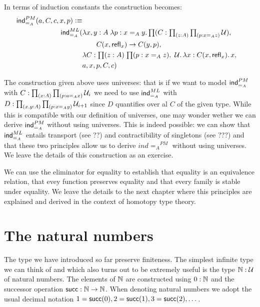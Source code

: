 In terms of induction constants the construction becomes:
\begin{align*}
\ind{=_A}^{PM}(a,C,c,x,p) \defeq \\
\ind{=_A}^{ML}( & \lam{x,y:A}{p:x =_A y} \prd{C : \prd{z:A}{p : x =_A z} \UU} \\
&\qquad C(x,\refl{x}) \to C(y,p),\\
& \lam{C:\prd{z:A}{p : x =_A z} \UU}\lam{x:C(x,\refl{x})} x,\\
& a,x,p,C,c) 
\end{align*}

The construction given above uses universes: that is if we want to model $\mathsf{ind}_{=_A}^{PM}$ with $C : \prd{x:A}{p : a =_A x} \UU_i$ we need to use $\mathsf{ind}_{=_A}^{ML}$ with $D:\prd{x,y:A}\prd{p:x =_A y} \UU_{i+1}$ since $D$ quantifies over al $C$ of the given type. While this is compatible with our definition of universes, one may wonder wether we can derive $\mathsf{ind}_{=_A}^{PM}$ without using universes. This is indeed possible: we can show that $\mathsf{ind}_{=_A}^{ML}$ entails transport (see ??) and contractibility of singletons (see ???) and that these two principles allow us to derive $ind{=_A}^{PM}$ without using universes. We leave the details of this construction as an exercise.

We can use the eliminator for equality to establish that equality is an equivalence relation, that evey function preserves equality and that every family is stable under equality. We leave the details to the next chapter where this principles are explained and derived in the context of homotopy type theory. 



\section{The natural numbers}
\label{sec:inductive-types}

The type we have introduced so far preserve finiteness. The simplest infinite type we can think of and which also turns out to be extremely useful is the type $\mathbb{N} : \mathcal{U}$ of natural numbers. The elements of $\mathbb{N}$ are constructed using $0 : \mathbb{N}$ and the successor operation $\mathsf{succ} : \mathbb{N} \to \mathbb{N}$. When denoting natural numbers we adopt the usual decimal notation $1 = \mathsf{succ}(0), 2 = \mathsf{succ}(1), 3 = \mathsf{succ}(2), \dots$.

